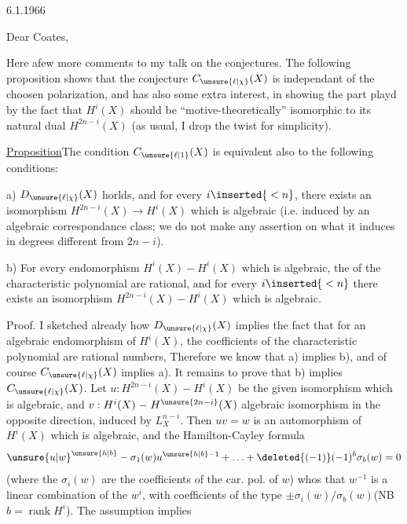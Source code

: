 
6.1.1966

Dear Coates,

Here a\inserted{\ }few more comments to my talk on the conjectures. The following proposition shows that the conjecture $C_{\unsure{\ell|\chi}}(X)$ is independant of the choosen polarization, and has also some extra interest, in showing the part playd by the fact that $H^i(X)$ should be ``motive-theoretically'' isomorphic to its natural dual $H^{2n-i}(X)$ (as usual, I drop the twist for simplicity).

\uline{Proposition}\quad The condition $C_{\unsure{\ell|1}}(X)$ is equivalent also to  the following conditions:

a) $D_{\unsure{\ell|\chi}}(X)$ horlds, and for every $i\inserted{{}<n}$, there exists an isomorphism $H^{2n-i}(X)\to H^i(X)$ which is algebraic (i.e. induced by an algebraic correspondance class; we do not make any assertion on what it induces in degrees different from $2n-i$).

b) For every endomorphism $H^i(X)\mathrel{-}H^i(X)$ which is algebraic, the  of the characteristic polynomial are rational, and for every $i\inserted{{}<n}$ there exists an isomorphism $H^{2n-i}(X)\mathrel{-}H^i(X)$ which is algebraic.

Proof. I sketched already how $D_{\unsure{\ell|\chi}}(X)$ implies the fact that for an algebraic endomorphism of $H^i(X)$, the coefficients of the characteristic polynomial are rational numbers, Therefore we know that a) implies b), and of course $C_{\unsure{\ell|\chi}}(X)$ implies a). It remains to prove that b) implies $C_{\unsure{\ell|\chi}}(X)$. Let $u:H^{2n-i}(X)\mathrel{-}H^i(X)$ be the given isomorphism which is algebraic, and $v:H^i(X)\mathrel{-}H^{\unsure{2n-i}}(X)$  algebraic isomorphism in the opposite direction, induced by $L_X^{n-i}$. Then $uv=w$ is an automorphism of $H^i(X)$ which is algebraic, and the Hamilton-Cayley formula
\[
\unsure{u|w}^{\unsure{h|b}}-\sigma_1(w)u^{\unsure{h|b}-1}+\ldots+\deleted{(-1)}(-1)^b\sigma_b(w)=0
\]
(where the $\sigma_i(w)$ are the coefficients of the car. pol. of $w$) whos that $w^{-1}$ is a linear combination of the $w^i$, with coefficients of the type $\pm\sigma_i(w)/\sigma_b(w)$\quad (NB $b=\operatorname{rank}H^i$). The assumption implies

